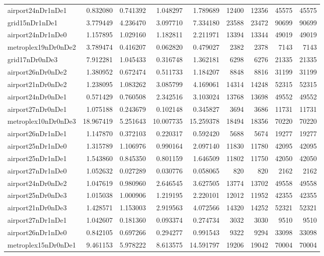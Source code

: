 \begin{longtable}{|l|r|r|r|r|r|r|r|r|}
airport24nDr1nDe1 & 0.832080 & 0.741392 & 1.048297 & 1.789689 & 12400 & 12356 & 45575 & 45575 \\
grid15nDr1nDe1 & 3.779449 & 4.236470 & 3.097710 & 7.334180 & 23588 & 23472 & 90699 & 90699 \\
airport24nDr1nDe0 & 1.157895 & 1.029160 & 1.182811 & 2.211971 & 13394 & 13344 & 49019 & 49019 \\
metroplex19nDr0nDe2 & 3.789474 & 0.416207 & 0.062820 & 0.479027 & 2382 & 2378 & 7143 & 7143 \\
grid17nDr0nDe3 & 7.912281 & 1.045433 & 0.316748 & 1.362181 & 6298 & 6276 & 21335 & 21335 \\
airport26nDr0nDe2 & 1.380952 & 0.672474 & 0.511733 & 1.184207 & 8848 & 8816 & 31199 & 31199 \\
airport21nDr0nDe2 & 1.238095 & 1.083262 & 3.085799 & 4.169061 & 14314 & 14248 & 52315 & 52315 \\
airport24nDr0nDe1 & 0.571429 & 0.760508 & 2.342516 & 3.103024 & 13768 & 13698 & 49552 & 49552 \\
airport27nDr0nDe1 & 1.075188 & 0.243679 & 0.102148 & 0.345827 & 3694 & 3686 & 11731 & 11731 \\
metroplex10nDr0nDe3 & 18.967419 & 5.251643 & 10.007735 & 15.259378 & 18494 & 18356 & 70220 & 70220 \\
airport26nDr1nDe1 & 1.147870 & 0.372103 & 0.220317 & 0.592420 & 5688 & 5674 & 19277 & 19277 \\
airport25nDr1nDe0 & 1.315789 & 1.106976 & 0.990164 & 2.097140 & 11830 & 11780 & 42095 & 42095 \\
airport25nDr1nDe1 & 1.543860 & 0.845350 & 0.801159 & 1.646509 & 11802 & 11750 & 42050 & 42050 \\
airport27nDr1nDe0 & 1.052632 & 0.027289 & 0.030776 & 0.058065 & 820 & 820 & 2162 & 2162 \\
airport24nDr0nDe2 & 1.047619 & 0.980960 & 2.646545 & 3.627505 & 13774 & 13702 & 49558 & 49558 \\
airport25nDr0nDe3 & 1.015038 & 1.000906 & 1.219195 & 2.220101 & 12012 & 11952 & 42355 & 42355 \\
airport21nDr0nDe3 & 1.428571 & 1.153003 & 2.919563 & 4.072566 & 14320 & 14252 & 52321 & 52321 \\
airport27nDr1nDe1 & 1.042607 & 0.181360 & 0.093374 & 0.274734 & 3032 & 3030 & 9510 & 9510 \\
airport26nDr1nDe0 & 0.842105 & 0.697266 & 0.294277 & 0.991543 & 9322 & 9294 & 33098 & 33098 \\
metroplex15nDr0nDe1 & 9.461153 & 5.978222 & 8.613575 & 14.591797 & 19206 & 19042 & 70004 & 70004 \\

\end{longtable}
